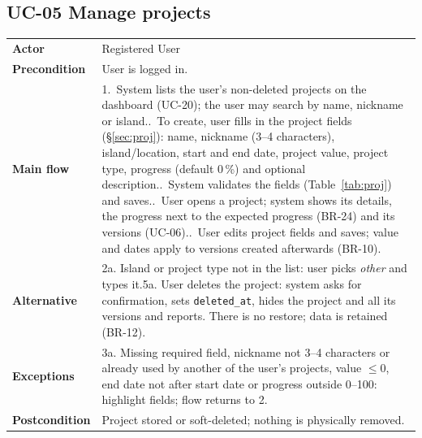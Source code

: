 \documentclass[11pt,a4paper]{article}
\begin{document}
\noindent\begin{minipage}{\linewidth}
\subsection*{UC-05 Manage projects}
\begin{tabularx}{\linewidth}{@{}>{\raggedright\leavevmode\bfseries\color{creBlue}}p{2.6cm} Y@{}}
\toprule
Actor & Registered User \\
Precondition & User is logged in. \\
Main flow & 1.~System lists the user's non-deleted projects on the dashboard (UC-20); the user may search by name, nickname or island..~To create, user fills in the project fields (\S\ref{sec:proj}): name, nickname (3--4 characters), island/location, start and end date, project value, project type, progress (default 0\,\%) and optional description..~System validates the fields (Table~\ref{tab:proj}) and saves..~User opens a project; system shows its details, the progress next to the expected progress (BR-24) and its versions (UC-06)..~User edits project fields and saves; value and dates apply to versions created afterwards (BR-10). \\
Alternative & 2a. Island or project type not in the list: user picks \emph{other} and types it.\newline 5a. User deletes the project: system asks for confirmation, sets \texttt{deleted\_at}, hides the project and all its versions and reports. There is no restore; data is retained (BR-12). \\
Exceptions & 3a. Missing required field, nickname not 3--4 characters or already used by another of the user's projects, value $\le 0$, end date not after start date or progress outside 0--100: highlight fields; flow returns to 2. \\
Postcondition & Project stored or soft-deleted; nothing is physically removed. \\
\bottomrule
\end{tabularx}
\end{minipage}
\par\medskip
\end{document}
